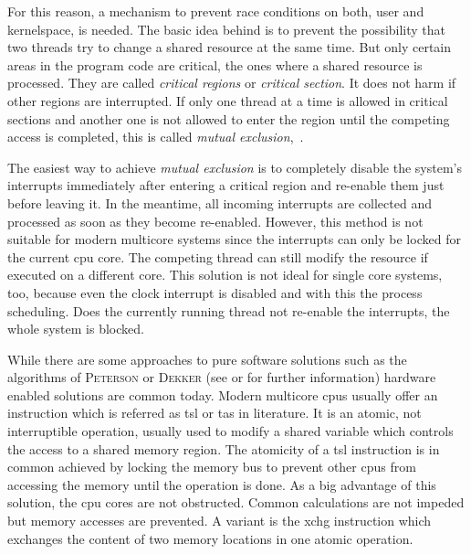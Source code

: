 For this reason, a mechanism to prevent race conditions on both, user and kernelspace, is needed.
The basic idea behind is to prevent the possibility that two threads try to change a shared resource at the same time\cite{tanenbaum-modern-operating-systems}.
But only certain areas in the program code are critical, the ones where a shared resource is processed.
They are called \textit{critical regions} or \textit{critical section}\cite{tanenbaum-modern-operating-systems}.
It does not harm if other regions are interrupted.
If only one thread at a time is allowed in critical sections and another one is not allowed to enter the region until the competing access is completed, this is called \textit{mutual exclusion}\cite{tanenbaum-modern-operating-systems},~\cite{glatz2015betriebssysteme}.

The easiest way to achieve \textit{mutual exclusion} is to completely disable the system's interrupts immediately after entering a critical region and re-enable them just before leaving it.
In the meantime, all incoming interrupts are collected and processed as soon as they become re-enabled\cite{achilles2006betriebssysteme}.
However, this method is not suitable for modern multicore systems since the interrupts can only be locked for the current \ac{cpu} core.
The competing thread can still modify the resource if executed on a different core.
This solution is not ideal for single core systems, too, because even the clock interrupt is disabled and with this the process scheduling.
Does the currently running thread not re-enable the interrupts, the whole system is blocked\cite{tanenbaum-modern-operating-systems}.

While there are some approaches to pure software solutions such as the algorithms of \textsc{Peterson} or \textsc{Dekker} (see \cite{tanenbaum-modern-operating-systems} or \cite{silberschatz2009operating} for further information) hardware enabled solutions are common today\cite{tanenbaum-modern-operating-systems}.
Modern multicore \acp{cpu} usually offer an instruction which is referred as \ac{tsl} or \ac{tas} in literature.
It is an atomic, not interruptible operation, usually used to modify a shared variable which controls the access to a shared memory region\cite{tanenbaum-modern-operating-systems}.
The atomicity of a \ac{tsl} instruction is in common achieved by locking the memory bus to prevent other \acp{cpu} from accessing the memory until the operation is done.
As a big advantage of this solution, the \ac{cpu} cores are not obstructed.
Common calculations are not impeded but memory accesses are prevented\cite{tanenbaum-modern-operating-systems}.
A variant is the \ac{xchg} instruction which exchanges the content of two memory locations in one atomic operation\cite{silberschatz2009operating}.

